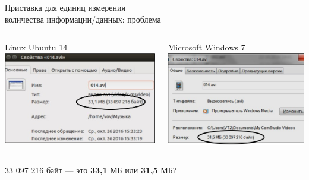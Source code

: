 \begin{frame}[t]{Приставка  для единиц измерения \\ количества информации/данных: проблема}
\begin{columns}
	\begin{column}{5cm}
	\begin{center}
		Linux Ubuntu 14\\
		\vskip 0.2cm
		\includegraphics[scale=0.4]{ubuntu}
	\end{center}
	\end{column}
	\begin{column}{5cm}
	\begin{center}
		Microsoft Windows 7\\
		\vskip 0.2cm
		\includegraphics[scale=0.4]{windows}
	\end{center}
	\end{column}
\end{columns}
\begin{center}
	33 097 216 байт --- это \textbf{33,1}\color{black} МБ или \textbf{31,5} \color{black} МБ?
\end{center}
\end{frame}